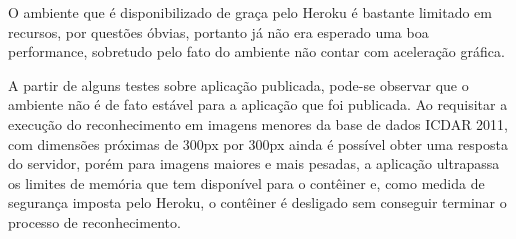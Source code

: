 O ambiente que é disponibilizado de graça pelo Heroku é bastante limitado em recursos, por questões óbvias, portanto já não era esperado uma boa performance, sobretudo pelo fato do ambiente não contar com aceleração gráfica.

A partir de alguns testes sobre aplicação publicada, pode-se observar que o ambiente não é de fato estável para a aplicação que foi publicada. Ao requisitar a execução do reconhecimento em imagens menores da base de dados ICDAR 2011, com dimensões próximas de 300px por 300px ainda é possível obter uma resposta do servidor, porém para imagens maiores e mais pesadas, a aplicação ultrapassa os limites de memória que tem disponível para o contêiner e, como medida de segurança imposta pelo Heroku, o contêiner é desligado sem conseguir terminar o processo de reconhecimento.